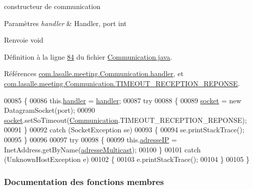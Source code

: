 constructeur de communication 


\begin{DoxyParams}{Paramètres}
{\em handler} & Handler, port int \\
\hline
\end{DoxyParams}
\begin{DoxyReturn}{Renvoie}
void 
\end{DoxyReturn}


Définition à la ligne \hyperlink{_communication_8java_source_l00084}{84} du fichier \hyperlink{_communication_8java_source}{Communication.\+java}.



Références \hyperlink{_communication_8java_source_l00039}{com.\+lasalle.\+meeting.\+Communication.\+handler}, et \hyperlink{_communication_8java_source_l00031}{com.\+lasalle.\+meeting.\+Communication.\+T\+I\+M\+E\+O\+U\+T\+\_\+\+R\+E\+C\+E\+P\+T\+I\+O\+N\+\_\+\+R\+E\+P\+O\+N\+SE}.


\begin{DoxyCode}
00085     \{
00086         this.\hyperlink{classcom_1_1lasalle_1_1meeting_1_1_communication_a05fa5f360f28819a9e106e0265a74643}{handler} = \hyperlink{classcom_1_1lasalle_1_1meeting_1_1_communication_a05fa5f360f28819a9e106e0265a74643}{handler};
00087         \textcolor{keywordflow}{try}
00088         \{
00089             \hyperlink{classcom_1_1lasalle_1_1meeting_1_1_communication_a2a538f36640aecebbb833bbaf1f03858}{socket} = \textcolor{keyword}{new} DatagramSocket(port);
00090             \hyperlink{classcom_1_1lasalle_1_1meeting_1_1_communication_a2a538f36640aecebbb833bbaf1f03858}{socket}.setSoTimeout(\hyperlink{classcom_1_1lasalle_1_1meeting_1_1_communication_a3d73554b2774d3274ad385b0faa27d14}{Communication}.TIMEOUT\_RECEPTION\_REPONSE);
00091         \}
00092         \textcolor{keywordflow}{catch} (SocketException se)
00093         \{
00094             se.printStackTrace();
00095         \}
00096 
00097         \textcolor{keywordflow}{try}
00098         \{
00099             this.\hyperlink{classcom_1_1lasalle_1_1meeting_1_1_communication_a46e5fbc8ec97ad651d544e09121a6468}{adresseIP} = InetAddress.getByName(\hyperlink{classcom_1_1lasalle_1_1meeting_1_1_communication_a6a2d2e62f87bef261a1999eb5acf8abb}{adresseMulticast});
00100         \}
00101         \textcolor{keywordflow}{catch} (UnknownHostException e)
00102         \{
00103             e.printStackTrace();
00104         \}
00105     \}
\end{DoxyCode}


\subsubsection{Documentation des fonctions membres}
\mbox{\label{classcom_1_1lasalle_1_1meeting_1_1_communication_abf23e6b879122267b3fe10233b4010a8}} 
